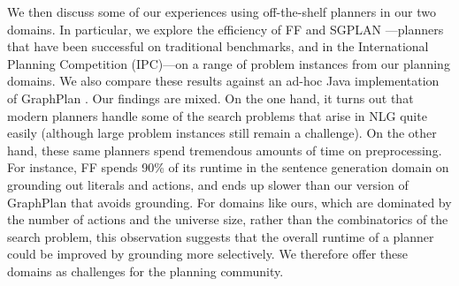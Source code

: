 We then discuss some of our experiences using off-the-shelf planners
in our two domains. In particular, we explore the efficiency of FF
\cite{HoffmannNebel01} and SGPLAN
\cite{hsu06:_new_featur_in_sgplan_for}---planners that have been successful
on traditional benchmarks, and in the International Planning Competition
(IPC)---on a range of problem instances from our planning domains.  We also
compare these results against an ad-hoc Java implementation of GraphPlan
\cite{Blum1997}.  Our findings are mixed. On the one hand, it turns out
that modern planners handle some of the search problems that arise in NLG
quite easily (although large problem instances still remain a challenge).
On the other hand, these same planners spend tremendous amounts of time on
preprocessing. For instance, FF spends 90\% of its runtime in the sentence
generation domain on grounding out literals and actions, and ends up slower
than our version of GraphPlan that avoids grounding. For domains like ours,
which are dominated by the number of actions and the universe size, rather
than the combinatorics of the search problem, this observation suggests
that the overall runtime of a planner could be improved by grounding more
selectively. We therefore offer these domains as challenges for the
planning community.




